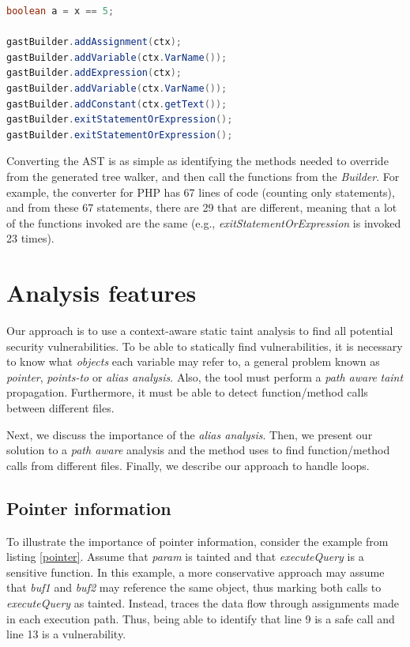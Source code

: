 \begin{lstlisting}[language=Java,
    showstringspaces=false,
    caption={Assignment build call sequence},
    label=assignmentconvertexample, float]
boolean a = x == 5;

gastBuilder.addAssignment(ctx);
gastBuilder.addVariable(ctx.VarName());
gastBuilder.addExpression(ctx);
gastBuilder.addVariable(ctx.VarName());
gastBuilder.addConstant(ctx.getText());
gastBuilder.exitStatementOrExpression();
gastBuilder.exitStatementOrExpression();
\end{lstlisting}




Converting the AST is as simple as identifying the methods needed to override from the generated tree walker, and then call the functions from the \textit{\astname{} Builder}.
For example, the converter for PHP has 67 lines of code (counting only statements), and from these 67 statements, there are 29 that are different, meaning that a lot of the functions invoked are the same (e.g., \textit{exitStatementOrExpression} is invoked 23 times). 


\section{Analysis features}
\label{analysisfeatures}
Our approach is to use a context-aware static taint analysis to find all potential security vulnerabilities. To be able to statically find vulnerabilities, it is necessary to know what \textit{objects} each variable may refer to, a general problem known as \textit{pointer}, \textit{points-to} or \textit{alias analysis}\cite{sridharan2013alias}. Also, the tool must perform a \textit{path aware} \textit{taint} propagation. Furthermore, it must be able to detect function/method calls between different files.

Next, we discuss the importance of the \textit{alias analysis}. Then, we present our solution to a \textit{path aware} analysis and the method \toolname{} uses to find function/method calls from different files. Finally, we describe our approach to handle loops.

\subsection{Pointer information} 
To illustrate the importance of pointer information, consider the example from listing \ref{pointer}. Assume that \textit{param} is tainted and that \textit{executeQuery} is a sensitive function. In this example, a more conservative approach may assume that \textit{buf1} and \textit{buf2} may reference the same object, thus marking both calls to \textit{executeQuery} as tainted. Instead, \toolname{} traces the data flow through assignments made in each execution path. Thus, being able to identify that line 9 is a safe call and line 13 is a vulnerability.


